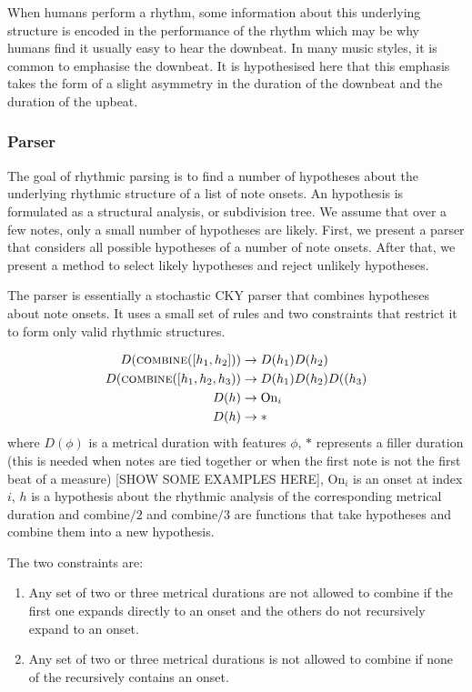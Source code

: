 When humans perform a rhythm, some information about this underlying structure is encoded in the performance of the rhythm which may be why humans find it usually easy to hear the downbeat. In many music styles, it is common to emphasise the downbeat. It is hypothesised here that this emphasis takes the form of a slight asymmetry in the duration of the downbeat and the duration of the upbeat.

\subsubsection{Parser}

The goal of rhythmic parsing is to find a number of hypotheses about the underlying rhythmic structure of a list of note onsets. An hypothesis is formulated as a structural analysis, or subdivision tree. We assume that over a few notes, only a small number of hypotheses are likely. First, we present a parser that considers all possible hypotheses of a number of note onsets. After that, we present a method to select likely hypotheses and reject unlikely hypotheses. 

The parser is essentially a stochastic CKY parser that combines hypotheses about note onsets. It uses a small set of rules and two constraints that restrict it to form only valid rhythmic structures. 

\begin{align*}
\label{eq:rules}
D(\textsc{combine}([h_1, h_2])) &\rightarrow D(h_1) D(h_2)\\
D(\textsc{combine}([h_1, h_2, h_3)) &\rightarrow D(h_1) D(h_2) D((h_3)\\
D(h) &\rightarrow \textrm{On}_i\\
D(h) &\rightarrow *
\end{align*}
where $D(\phi)$ is a metrical duration with features $\phi$, $*$ represents a filler duration (this is needed when notes are tied together or when the first note is not the first beat of a measure) [SHOW SOME EXAMPLES HERE], $\textrm{On}_i$ is an onset at index $i$, $h$ is a hypothesis about the rhythmic analysis of the corresponding metrical duration and $\textrm{combine}/2$ and $\textrm{combine}/3$ are functions that take hypotheses and combine them into a new hypothesis.

The two constraints are:
\begin{enumerate}
\item Any set of two or three metrical durations are not allowed to combine if the first one expands directly to an onset and the others do not recursively expand to an onset.
\item Any set of two or three metrical durations is not allowed to combine if none of the recursively contains an onset.
\end{enumerate}

